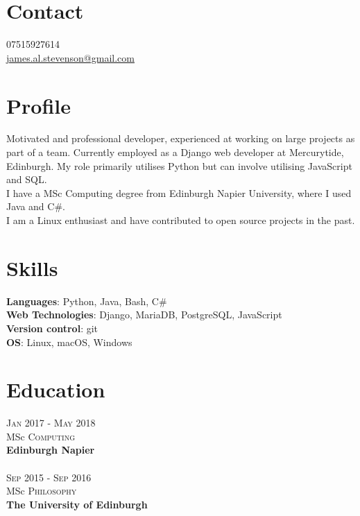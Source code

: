 \documentclass[12pt, a4paper]{article}
\begin{document}
\par{\bigskip\par
\section{Contact}
\large
07515927614\\
\href{mailto:james.al.stevenson@gmail.com}{james.al.stevenson@gmail.com}\\
}

\begin{multicols}{2}

\section{Profile}
\noindent Motivated and professional developer, experienced at working on large projects as part of a team. Currently employed as a Django web developer at Mercurytide, Edinburgh. My role primarily utilises Python but can involve utilising JavaScript and SQL.\\
I have a MSc Computing degree from Edinburgh Napier University, where I used Java and C\#.\\
I am a Linux enthusiast and have contributed to open source projects in the past.

\section{Skills}
\small
\noindent\textbf{Languages}: Python, Java, Bash, C\#\\
\textbf{Web Technologies}: Django, MariaDB, PostgreSQL, JavaScript\\
\textbf{Version control}: git\\
\textbf{OS}: Linux, macOS, Windows

\section{Education}
\noindent\textsc{Jan} 2017 - \textsc{May} 2018\\
MSc \textsc{Computing} \\
\textbf{Edinburgh Napier}\\~\\
\textsc{Sep} 2015 - \textsc{Sep} 2016\\
MSc \textsc{Philosophy} \\ 
\textbf{The University of Edinburgh}


\end{multicols}
\end{document}
